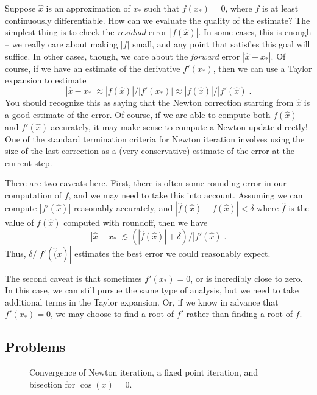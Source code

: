 \documentclass[12pt, leqno]{article}
\begin{document}
Suppose $\hat{x}$ is an approximation of $x_*$ such that $f(x_*) = 0$,
where $f$ is at least continuously differentiable.  How can we
evaluate the quality of the estimate?  The simplest thing is to check
the {\em residual} error $|f(\hat{x})|$.  In some cases, this is
enough -- we really care about making $|f|$ small, and any point that
satisfies this goal will suffice.  In other cases, though,
we care about the {\em forward} error $|\hat{x}-x_*|$.  Of course,
if we have an estimate of the derivative $f'(x_*)$, then we can
use a Taylor expansion to estimate
\[
  |\hat{x}-x_*| \approx |f(\hat{x})|/|f'(x_*)|
                \approx |f(\hat{x})|/|f'(\hat{x})|.
\]
You should recognize this as saying that the Newton correction
starting from $\hat{x}$ is a good estimate of the error.  Of course,
if we are able to compute both $f(\hat{x})$ and $f'(\hat{x})$
accurately, it may make sense to compute a Newton update directly!
One of the standard termination criteria for Newton iteration involves
using the size of the last correction as a (very conservative)
estimate of the error at the current step.

There are two caveats here.  First, there is often some rounding error
in our computation of $f$, and we may need to take this into account.
Assuming we can compute $|f'(\hat{x})|$ reasonably accurately, and
$|\hat{f}(\hat{x})-f(\hat{x})| < \delta$ where $\hat{f}$ is the value
of $f(\hat{x})$ computed with roundoff, then we have
\[
  |\hat{x}-x_*| \lesssim (|\hat{f}(\hat{x})|+\delta)/|f'(\hat{x})|.
\]
Thus, $\delta/|f'(\hat(x)|$ estimates the best error we could
reasonably expect.

The second caveat is that sometimes $f'(x_*) = 0$, or is incredibly
close to zero.  In this case, we can still pursue the same type of
analysis, but we need to take additional terms in the Taylor
expansion.  Or, if we know in advance that $f'(x_*) = 0$, we may
choose to find a root of $f'$ rather than finding a root of $f$.

\subsection{Problems}

\begin{figure}
  \caption{Convergence of Newton iteration, a fixed point iteration,
    and bisection for $\cos(x) = 0$.}
  \label{fig:itercomp}
\end{figure}
\end{document}
